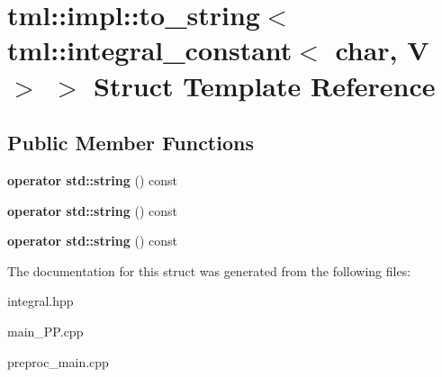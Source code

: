 \hypertarget{structtml_1_1impl_1_1to__string_3_01tml_1_1integral__constant_3_01char_00_01V_01_4_01_4}{\section{tml\+:\+:impl\+:\+:to\+\_\+string$<$ tml\+:\+:integral\+\_\+constant$<$ char, V $>$ $>$ Struct Template Reference}
\label{structtml_1_1impl_1_1to__string_3_01tml_1_1integral__constant_3_01char_00_01V_01_4_01_4}
}
\subsection*{Public Member Functions}
\begin{DoxyCompactItemize}
\item 
\hypertarget{structtml_1_1impl_1_1to__string_3_01tml_1_1integral__constant_3_01char_00_01V_01_4_01_4_ae0d7549c25856c74afd201b09f4899b1}{{\bfseries operator std\+::string} () const }\label{structtml_1_1impl_1_1to__string_3_01tml_1_1integral__constant_3_01char_00_01V_01_4_01_4_ae0d7549c25856c74afd201b09f4899b1}

\item 
\hypertarget{structtml_1_1impl_1_1to__string_3_01tml_1_1integral__constant_3_01char_00_01V_01_4_01_4_ae0d7549c25856c74afd201b09f4899b1}{{\bfseries operator std\+::string} () const }\label{structtml_1_1impl_1_1to__string_3_01tml_1_1integral__constant_3_01char_00_01V_01_4_01_4_ae0d7549c25856c74afd201b09f4899b1}

\item 
\hypertarget{structtml_1_1impl_1_1to__string_3_01tml_1_1integral__constant_3_01char_00_01V_01_4_01_4_ae0d7549c25856c74afd201b09f4899b1}{{\bfseries operator std\+::string} () const }\label{structtml_1_1impl_1_1to__string_3_01tml_1_1integral__constant_3_01char_00_01V_01_4_01_4_ae0d7549c25856c74afd201b09f4899b1}

\end{DoxyCompactItemize}


The documentation for this struct was generated from the following files\+:\begin{DoxyCompactItemize}
\item 
integral.\+hpp\item 
main\+\_\+\+P\+P.\+cpp\item 
preproc\+\_\+main.\+cpp\end{DoxyCompactItemize}
